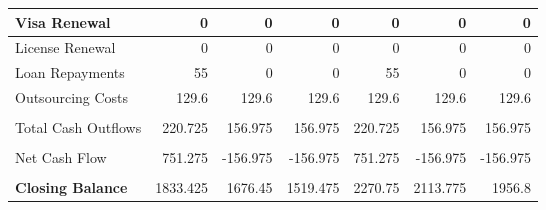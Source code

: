 \begin{table}[htbp]
\begin{tabular}{|l|r|r|r|r|r|r|}
    \midrule
    Visa Renewal & 0     & 0     & 0     & 0     & 0     & 0 \\
    \midrule
    License Renewal & 0     & 0     & 0     & 0     & 0     & 0 \\
    \midrule
    Loan Repayments & 55    & 0     & 0     & 55    & 0     & 0 \\
    \midrule
    Outsourcing Costs & 129.6 & 129.6 & 129.6 & 129.6 & 129.6 & 129.6 \\
    \midrule
          &       &       &       &       &       &  \\
    \midrule
    Total Cash Outflows & 220.725 & 156.975 & 156.975 & 220.725 & 156.975 & 156.975 \\
    \midrule
          &       &       &       &       &       &  \\
    \midrule
    Net Cash Flow & 751.275 & -156.975 & -156.975 & 751.275 & -156.975 & -156.975 \\
    \midrule
          &       &       &       &       &       &  \\
    \midrule
    \textbf{Closing Balance} & 1833.425 & 1676.45 & 1519.475 & 2270.75 & 2113.775 & 1956.8 \\
    \bottomrule
    \hline
    \hline
    \end{tabular}%
  \label{tab:addlabel}%
\end{table}%

